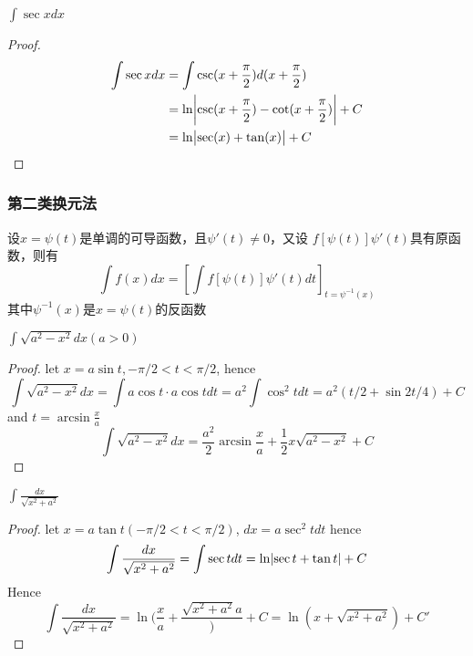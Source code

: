 \documentclass[11pt]{article}
\begin{document}
\begin{proposition}[]
\(\int\sec xdx\)
\end{proposition}

\begin{proof}
\begin{align*}
\int\sec xdx&=\int\csc(x+\frac{\pi}{2})d(x+\frac{\pi}{2})\\
&=\ln\abs{\csc(x+\frac{\pi}{2})-\cot(x+\frac{\pi}{2})}+C\\
&=\ln\abs{\sec(x)+\tan(x)}+C
\end{align*}
\end{proof}
\subsubsection{第二类换元法}
\label{sec:org67965c1}
\begin{theorem}[]
设\(x=\psi(t)\)是单调的可导函数，且\(\psi'(t)\neq0\)，又设
\(f[\psi(t)]\psi'(t)\)具有原函数，则有
\begin{equation*}
\int f(x)dx=\left[\int f[\psi(t)]\psi'(t)dt\right]_{t=\psi^{-1}(x)}
\end{equation*}
其中\(\psi^{-1}(x)\)是\(x=\psi(t)\)的反函数
\end{theorem}

\begin{proposition}[]
\(\int\sqrt{a^2-x^2}dx(a>0)\)
\end{proposition}

\begin{proof}
let \(x=a\sin t,-\pi/2<t<\pi/2\), hence
\begin{equation*}
\int\sqrt{a^2-x^2}dx=\int a\cos t\cdot a\cos tdt=a^2\int\cos^2tdt=a^2(t/2+\sin2t/4)+C
\end{equation*}
and \(t=\arcsin\frac{x}{a}\)
\begin{equation*}
\int\sqrt{a^2-x^2}dx=\frac{a^2}{2}\arcsin\frac{x}{a}+\frac{1}{2}x\sqrt{a^2-x^2}+C
\end{equation*}
\end{proof}

\begin{proposition}[]
\(\int\frac{dx}{\sqrt{x^2+a^2}}\)
\end{proposition}

\begin{proof}
let \(x=a\tan t(-\pi/2<t<\pi/2)\), \(dx=a\sec^2tdt\)
hence
\begin{equation*}
\int\frac{dx}{\sqrt{x^2+a^2}}=\int\sec tdt=\ln\abs{\sec t+\tan t}+C
\end{equation*}
Hence
\begin{equation*}
\int\frac{dx}{\sqrt{x^2+a^2}}=\ln(\frac{x}{a}+\frac{\sqrt{x^2+a^2}{a}})+C=\ln(x+\sqrt{x^2+a^2})+C'
\end{equation*}
\end{proof}
\end{document}
